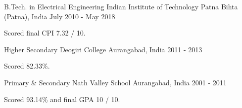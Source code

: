 
\begin{cventries}

\cventry
	{B.Tech. in Electrical Engineering} %
	{Indian Institute of Technology Patna} %
	{Bihta (Patna), India} %
	{July 2010 - May 2018} %
	{\begin{cvitems} %
		\item {Scored final CPI 7.32 / 10.}
	\end{cvitems}}

\cventry
	{Higher Secondary} %
	{Deogiri College} %
	{Aurangabad, India} %
	{2011 - 2013} %
	{\begin{cvitems} %
		\item {Scored 82.33\%.}
	\end{cvitems}}

\cventry
	{Primary \& Secondary} %
	{Nath Valley School} %
	{Aurangabad, India} %
	{2001 - 2011} %
	{\begin{cvitems} %
		\item {Scored 93.14\% and final GPA 10 / 10.}
	\end{cvitems}}

\end{cventries}
